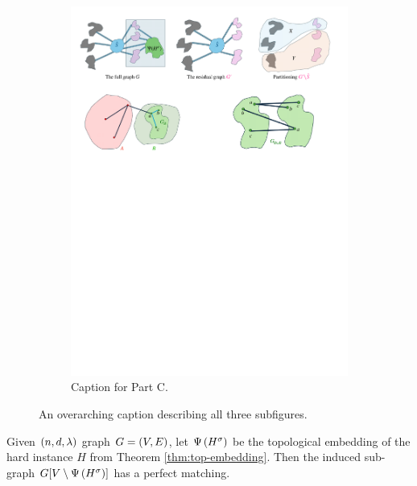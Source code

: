 \documentclass[11pt]{article}
\begin{document}
\begin{figure}
\begin{subfigure}[t]{0.3\textwidth}
        \includegraphics[width=\textwidth]{assets/part-c.pdf}
        \caption{\small Caption for Part C.}
    \end{subfigure}
    \caption{An overarching caption describing all three subfigures.}
    \label{fig:three-images}
\end{figure}


\begin{theorem}\label{thm:perfect-matching}
Given $(n, d, \lambda)$ graph $G=(V,E)$, let $\Psi\left({H}^{\sigma}\right)$ be the topological embedding of the hard instance $H$ from Theorem \ref{thm:top-embedding}.
Then the induced sub-graph $G[V \setminus \Psi\left({H}^{\sigma}\right)]$ has a perfect matching.	
	
\end{theorem}
\end{document}
